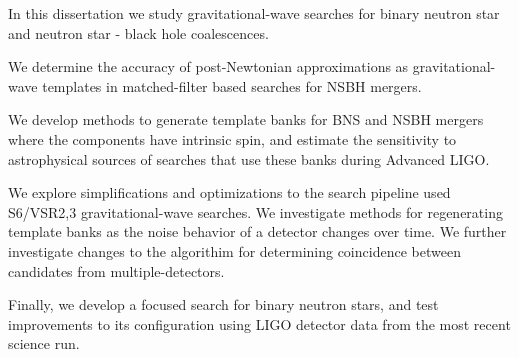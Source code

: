 
In this dissertation we study gravitational-wave searches for 
binary neutron star and neutron star - black hole coalescences. 

We determine the accuracy of post-Newtonian approximations as gravitational-wave
templates in matched-filter based searches for NSBH mergers.

We develop methods to generate template banks for BNS and NSBH mergers where
the components have intrinsic spin, and estimate the sensitivity to
astrophysical sources of searches that use these banks during Advanced LIGO.

We explore simplifications and optimizations to the search pipeline used 
S6/VSR2,3 gravitational-wave searches. We investigate methods for regenerating
template banks as the noise behavior of a detector changes over time. We further
investigate changes to the algorithim for determining coincidence between
candidates from multiple-detectors.

Finally, we develop a focused search for binary neutron stars, and test improvements
to its configuration using LIGO detector data from the most recent science
run.
